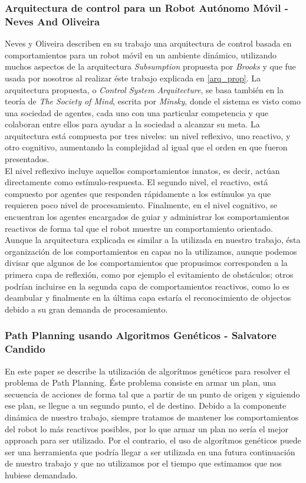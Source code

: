 \subsubsection{Arquitectura de control para un Robot Aut\'onomo M\'ovil -
Neves And Oliveira \cite{Neves97acontrol}}
Neves y Oliveira describen en su trabajo una arquitectura de control basada en
comportamientos para un robot m\'ovil en un ambiente din\'amico, utilizando
muchos aspectos de la arquitectura \emph{Subsumption} propuesta por
\emph{Brooks} y que fue usada por nosotros al realizar \'este trabajo explicada
en \ref{arq_prop}. La arquitectura propuesta, o
\emph{Control System Arquitecture}, se basa tambi\'en en la teor\'ia de 
\emph{The Society of Mind}, escrita por \emph{Minsky}, donde el sistema es
visto como una sociedad de agentes, cada uno con una particular competencia y
que colaboran entre ellos para ayudar a la sociedad a alcanzar su meta.
La arquitectura est\'a compuesta por tres niveles: un nivel reflexivo, uno
reactivo, y otro cognitivo, aumentando la complejidad al igual que el orden en
que fueron presentados.
\\
El nivel reflexivo incluye aquellos comportamientos innatos, es decir, act\'uan
directamente como est\'imulo-respuesta. El segundo nivel, el reactivo, est\'a
compuesto por agentes que responden r\'apidamente a los est\'imulos ya que
requieren poco nivel de procesamiento. Finalmente, en el nivel cognitivo, se
encuentran los agentes encargados de guiar y administrar los comportamientos
reactivos de forma tal que el robot muestre un comportamiento orientado.
\\
Aunque la arquitectura explicada es similar a la utilizada en nuestro trabajo,
\'esta organizaci\'on de los comportamientos en capas no la utilizamos, aunque
podemos divisar que algunos de los comportamientos que propusimos corresponden
a la primera capa de reflexi\'on, como por ejemplo el evitamiento de
obst\'aculos; otros podr\'ian incluirse en la segunda capa de comportamientos
reactivos, como lo es deambular y finalmente en la \'ultima capa estar\'ia el
reconocimiento de objectos debido a su gran demanda de procesamiento.

\subsubsection{Path Planning usando Algoritmos Gen\'eticos - Salvatore Candido
\cite{salvatore}}
En este paper se describe la utilizaci\'on de algor\'itmos gen\'eticos para
resolver el problema de Path Planning. \'Este problema consiste en armar un
plan, una secuencia de acciones de forma tal que a partir de un punto de origen
y siguiendo ese plan, se llegue a un segundo punto, el de destino. Debido a la
componente din\'amica de nuestro trabajo, siempre tratamos de mantener los
comportamientos del robot lo m\'as reactivos posibles, por lo que armar un plan
no ser\'ia el mejor approach para ser utilizado. Por el contrario, el uso de
algor\'itmos gen\'eticos puede ser una herramienta que podr\'ia llegar a ser
utilizada en una futura continuaci\'on de nuestro trabajo y que no utilizamos
por el tiempo que estimamos que nos hubiese demandado.

